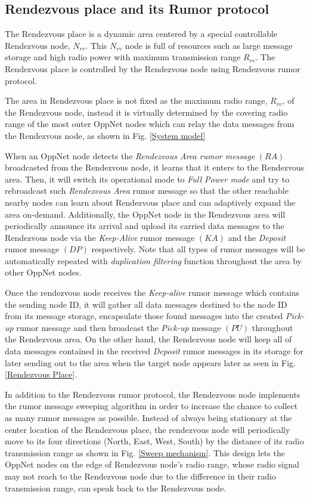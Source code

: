 \documentclass[conference]{IEEEtran}
\begin{document}
\subsection{Rendezvous place and its Rumor protocol}

The Rendezvous place is a dynamic area centered by a special controllable Rendezvous node, $N_{rv}$.
This $N_{rv}$ node is full of resources such as large message storage and high radio power with maximum transmission range $R_{rv}$.
The Rendezvous place is controlled by the Rendezvous node using Rendezvous rumor protocol.

The area in Rendezvous place is not fixed as the maximum radio range, $R_{rv}$,  of the Rendezvous node, instead it is virtually determined by the covering radio range of the most outer OppNet nodes which can relay the data messages from the Rendezvous node, as shown in Fig. \ref{System model}

When an OppNet node detects the \emph{Rendezvous Area rumor message} $(RA)$ broadcasted from the Rendezvous node, it learns that it enters to the Rendezvous area.
Then, it will switch its operational mode to \emph{Full Power mode} and try to rebroadcast such \emph{Rendezvous Area }rumor message so that the other reachable nearby nodes can learn about Rendezvous place and can adaptively expand the area on-demand.
Additionally, the OppNet node in the Rendezvous area will periodically announce its arrival and upload its carried data messages to the Rendezvous node via the \emph{Keep-Alive} rumor message $(KA)$ and the \emph{Deposit} rumor message $(DP)$ respectively.
Note that all types of rumor messages will be automatically repeated with \emph{duplication filtering} function throughout the area by other OppNet nodes.

Once the rendezvous node receives the \emph{Keep-alive} rumor message which contains the sending node ID, it will gather all data messages destined to the node ID from its message storage, encapsulate those found messages into the created \emph{Pick-up} rumor message and then broadcast the \emph{Pick-up} message $(PU)$ throughout the Rendezvous area.
On the other hand, the Rendezvous node will keep all of data messages contained in the received \emph{Deposit} rumor messages in its storage for later sending out to the area when the target node appears later as seen in Fig. \ref{Rendezvous Place}. 

In addition to the Rendezvous rumor protocol, the Rendezvous node implements the rumor message sweeping algorithm in order to increase the chance to collect as many rumor messages as possible.
Instead of always being stationary at the center location of the Rendezvous place, the rendezvous node will periodically move to its four directions (North, East, West, South) by the distance of its radio transmission range as shown in Fig. \ref{Sweep mechanism}.
This design lets the OppNet nodes on the edge of Rendezvous node's radio range, whose radio signal may not reach to the Rendezvous node due to the difference in their radio transmission range, can speak back to the Rendezvous node.
\end{document}
